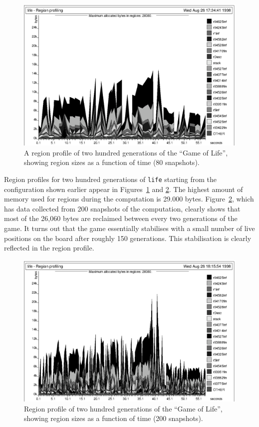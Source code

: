 \documentclass[12pt]{book}
\begin{document}
\begin{figure}
\begin{center}
\includegraphics{life80.ps}
\end{center}
\caption{A region profile of two hundred 
generations of the ``Game of Life'', showing
region sizes as a function of time (80 snapshots).}
\label{lifeprof80.fig}
\end{figure}


Region profiles for two hundred generations of {\tt life} starting from the configuration
shown earlier appear in Figures~\ref{lifeprof80.fig} and \ref{lifeprof200.fig}.
The highest amount of memory used for regions during the computation is
29.000 bytes. Figure~\ref{lifeprof200.fig}, which has data collected from 200 snapshots
of the computation, clearly shows that most of the 26,060 bytes are reclaimed between
every two generations of the game. It turns out that the game essentially stabilises
with a small number of live positions on the board after roughly 150 generations.
This stabilisation is clearly reflected in the region profile.

\begin{figure}
\begin{center}
\includegraphics{life200.ps}
\end{center}
\caption{Region profile of two hundred 
generations of the ``Game of Life'', showing
region sizes as a function of time (200 snapshots).}
\label{lifeprof200.fig}
\end{figure}
\end{document}
